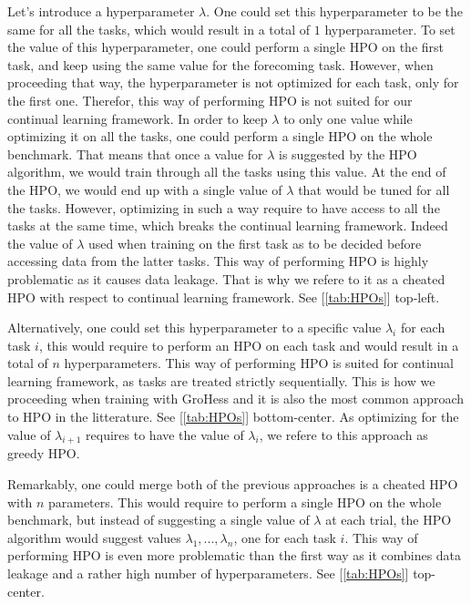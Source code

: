 \documentclass[11pt]{article}
\begin{document}
\vspace{2mm}
\noindent
Let's introduce a hyperparameter $\lambda$. One could set this hyperparameter to be the same for all the tasks, which would result in a total of $1$ hyperparameter. To set the value of this hyperparameter, one could perform a single HPO on the first task, and keep using the same value for the forecoming task. However, when proceeding that way, the hyperparameter is not optimized for each task, only for the first one. Therefor, this way of performing HPO is not suited for our continual learning framework. In order to keep $\lambda$ to only one value while optimizing it on all the tasks, one could perform a single HPO on the whole benchmark. That means that once a value for $\lambda$ is suggested by the HPO algorithm, we would train through all the tasks using this value. At the end of the HPO, we would end up with a single value of $\lambda$ that would be tuned for all the tasks. However, optimizing in such a way require to have access to all the tasks at the same time, which breaks the continual learning framework. Indeed the value of $\lambda$ used when training on the first task as to be decided before accessing data from the latter tasks. This way of performing HPO is highly problematic as it causes data leakage. That is why we refere to it as a cheated HPO with respect to continual learning framework. See [\ref{tab:HPOs}] top-left.

\vspace{2mm}
\noindent
Alternatively, one could set this hyperparameter to a specific value $\lambda_i$ for each task $i$, this would require to perform an HPO on each task and would result in a total of $n$ hyperparameters. This way of performing HPO is suited for continual learning framework, as tasks are treated strictly sequentially. This is how we proceeding when training with GroHess and it is also the most common approach to HPO in the litterature. See [\ref{tab:HPOs}] bottom-center. As optimizing for the value of $\lambda_{i+1}$ requires to have the value of $\lambda_i$, we refere to this approach as greedy HPO.

\vspace{2mm}
\noindent
Remarkably, one could merge both of the previous approaches is a cheated HPO with $n$ parameters. This would require to perform a single HPO on the whole benchmark, but instead of suggesting a single value of $\lambda$ at each trial, the HPO algorithm would suggest values $\lambda_1,...,\lambda_n$, one for each task $i$. This way of performing HPO is even more problematic than the first way as it combines data leakage and a rather high number of hyperparameters. See [\ref{tab:HPOs}] top-center.
\end{document}
